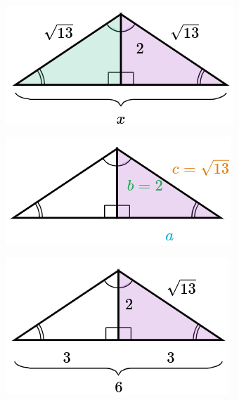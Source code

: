 \begin{solutionbox}{10cm}\footnotesize
    \begin{minipage}{0.2\textwidth}
        \begin{figure}[H]
            \centering
            \includegraphics[width=0.85\linewidth]{../images/pitagoras10a.png}
            \caption{}
            \label{fig:pitagoras10a}
        \end{figure}
        \begin{figure}[H]
            \centering
            \includegraphics[width=0.85\linewidth]{../images/pitagoras10b.png}
            \caption{}
            \label{fig:pitagoras10b}
        \end{figure}
        \begin{figure}[H]
            \centering
            \includegraphics[width=0.85\linewidth]{../images/pitagoras10c.png}

\end{figure}
\end{minipage}
\end{solutionbox}
